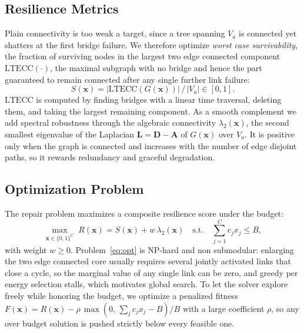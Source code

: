 \documentclass[journal]{IEEEtran}
\begin{document}
\subsection{Resilience Metrics}
Plain connectivity is too weak a target, since a tree spanning $V_a$ is connected yet shatters at the first bridge failure. We therefore optimize \emph{worst case survivability}, the fraction of surviving nodes in the largest two edge connected component $\mathrm{LTECC}(\cdot)$, the maximal subgraph with no bridge and hence the part guaranteed to remain connected after any single further link failure:
\begin{equation}
S(\mathbf{x}) = \big|\mathrm{LTECC}(G(\mathbf{x}))\big| \,/\, |V_a| \in [0,1].
\label{eq:surv}
\end{equation}
$\mathrm{LTECC}$ is computed by finding bridges with a linear time traversal, deleting them, and taking the largest remaining component. As a smooth complement we add spectral robustness through the algebraic connectivity $\lambda_2(\mathbf{x})$, the second smallest eigenvalue of the Laplacian $\mathbf{L}=\mathbf{D}-\mathbf{A}$ of $G(\mathbf{x})$ over $V_a$. It is positive only when the graph is connected and increases with the number of edge disjoint paths, so it rewards redundancy and graceful degradation.

\subsection{Optimization Problem}
The repair problem maximizes a composite resilience score under the budget:
\begin{equation}
\max_{\mathbf{x}\in\{0,1\}^{C}} \; R(\mathbf{x}) = S(\mathbf{x}) + w\,\lambda_2(\mathbf{x})
\quad \text{s.t.} \quad \textstyle\sum_{j=1}^{C} c_j x_j \le B ,
\label{eq:opt}
\end{equation}
with weight $w\ge 0$. Problem~\eqref{eq:opt} is NP-hard and non submodular: enlarging the two edge connected core usually requires several jointly activated links that close a cycle, so the marginal value of any single link can be zero, and greedy per energy selection stalls, which motivates global search. To let the solver explore freely while honoring the budget, we optimize a penalized fitness $F(\mathbf{x})=R(\mathbf{x})-\rho\,\max(0,\,\sum_j c_j x_j-B)/B$ with a large coefficient $\rho$, so any over budget solution is pushed strictly below every feasible one.
\end{document}
